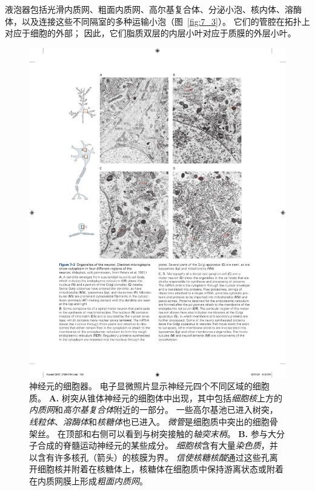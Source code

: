 液泡器包括光滑内质网、粗面内质网、高尔基复合体、分泌小泡、核内体、溶酶体，以及连接这些不同隔室的多种运输小泡（图~\ref{fig:7_3}）。
它们的管腔在拓扑上对应于细胞的外部；
因此，它们脂质双层的内层小叶对应于质膜的外层小叶。


\begin{figure}[htbp]
	\centering
	\includegraphics[width=1.0\linewidth]{chap07/fig_7_3}
	\caption{神经元的细胞器。
		电子显微照片显示神经元四个不同区域的细胞质\cite{peters1991neuropil}。
		\textbf{A.} 树突从锥体神经元的细胞体中出现，其中包括\textit{细胞核}上方的\textit{内质网}和\textit{高尔基复合体}附近的一部分。
		一些高尔基池已进入树突，\textit{线粒体}、\textit{溶酶体}和\textit{核糖体}也已进入。
		\textit{微管}是细胞质中突出的细胞骨架丝。
		在顶部和右侧可以看到与树突接触的\textit{轴突末梢}。
		\textbf{B.} 参与大分子合成的脊髓运动神经元的某些成分。
		\textit{细胞核}含有大量\textit{染色质}，并以含有许多核孔（箭头）的核膜为界。
		\textit{信使核糖核酸}通过这些孔离开细胞核并附着在核糖体上，核糖体在细胞质中保持游离状态或附着在内质网膜上形成\textit{粗面内质网}。
}
\end{figure}
